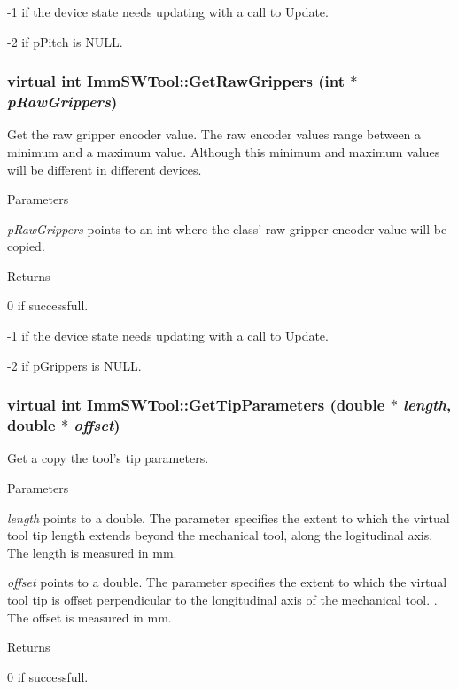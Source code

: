 -\/1 if the device state needs updating with a call to Update.

-\/2 if pPitch is NULL. \hypertarget{classImmSWTool_a3f698e8f0e65e9fa5d4ce2fdd23c3840}{
\subsubsection[{GetRawGrippers}]{\setlength{\rightskip}{0pt plus 5cm}virtual int ImmSWTool::GetRawGrippers (int $\ast$ {\em pRawGrippers})}}
\label{classImmSWTool_a3f698e8f0e65e9fa5d4ce2fdd23c3840}
Get the raw gripper encoder value. The raw encoder values range between a minimum and a maximum value. Although this minimum and maximum values will be different in different devices.


\begin{DoxyParams}{Parameters}
\item[{\em pRawGrippers}]points to an int where the class' raw gripper encoder value will be copied.\end{DoxyParams}
\begin{DoxyReturn}{Returns}

\end{DoxyReturn}
0 if successfull.

-\/1 if the device state needs updating with a call to Update.

-\/2 if pGrippers is NULL. \hypertarget{classImmSWTool_afa3068b7a4575c255654378134f524c0}{
\subsubsection[{GetTipParameters}]{\setlength{\rightskip}{0pt plus 5cm}virtual int ImmSWTool::GetTipParameters (double $\ast$ {\em length}, \/  double $\ast$ {\em offset})}}
\label{classImmSWTool_afa3068b7a4575c255654378134f524c0}
Get a copy the tool's tip parameters.


\begin{DoxyParams}{Parameters}
\item[{\em length}]points to a double. The parameter specifies the extent to which the virtual tool tip length extends beyond the mechanical tool, along the logitudinal axis. The length is measured in mm.\item[{\em offset}]points to a double. The parameter specifies the extent to which the virtual tool tip is offset perpendicular to the longitudinal axis of the mechanical tool. . The offset is measured in mm.\end{DoxyParams}
\begin{DoxyReturn}{Returns}

\end{DoxyReturn}
0 if successfull.

